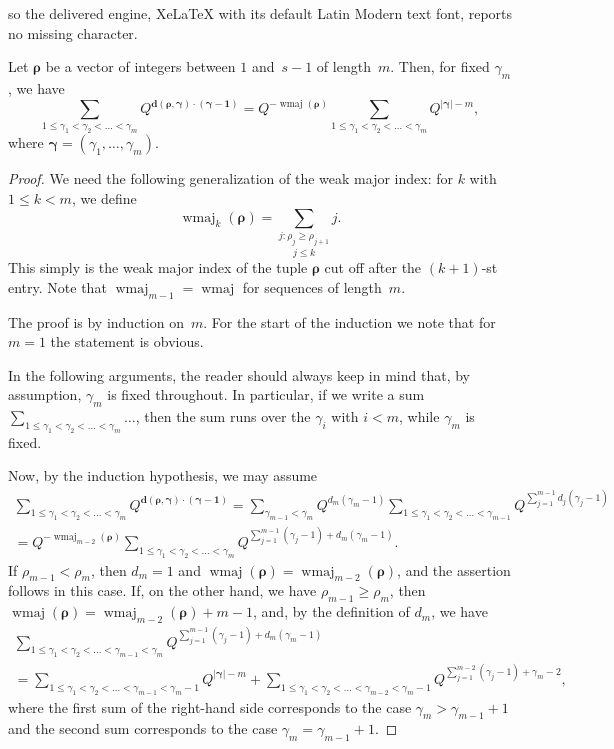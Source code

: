 \documentclass[10pt,a4paper]{amsart}
\DeclareMathOperator{\wmaj}{wmaj}
\newcommand{\posi}{{\gamma}}
\newcommand{\pos}{{\boldsymbol\gamma}}
\newcommand{\rem}{{\boldsymbol\rho}}
\begin{document}
so the delivered engine, XeLaTeX with its default Latin Modern text font, reports no missing character.
\begin{lemma}
\label{maj}
Let $\rem$ be a vector of integers between $1$ and~$s-1$ of length~$m$. Then, for fixed $\posi_m$, we have
$$
\sum_{1 \le \posi_1 < \posi_2 < \dots < \posi_m} Q^{{\mathbf d}(\rem,\pos) \cdot ({\pos- \mathbf 1})} =
Q^{-\wmaj(\rem)} \sum_{1 \le \posi_1 < \posi_2 < \dots < \posi_m} Q^{|\pos|-m},
$$
where $\pos=(\posi_1,\dots,\posi_m)$.
\end{lemma}

\begin{proof}
We need the following generalization of the weak major index: for $k$ with $1 \le k < m$,
we define
$$
\wmaj_k(\rem)= \underset{j\le k}{\sum_{j:\rho_j \ge \rho_{j+1}}} j.
$$
This simply is the weak major index of the tuple $\rem$ cut off after
the {$(k+1)$-st entry.} Note that $\wmaj_{m-1}=\wmaj$ for sequences of
length~$m$. 

The proof is by induction on~$m$. For the start of the
induction we note that for $m=1$ the statement is obvious.

In the following arguments, the reader should always keep in mind
that, by assumption, $\posi_m$ is fixed throughout.
In particular, if we write a sum 
$\sum_{1 \le \posi_1 < \posi_2 < \dots < \posi_m} \dots$, then the
sum runs over the $\posi_i$ with $i<m$, while $\posi_m$ is fixed. 

Now, by the induction hypothesis, we may assume
\begin{multline*}
\sum_{1 \le \posi_1 < \posi_2 < \dots < \posi_m} Q^{{\mathbf d}(\rem, \pos) \cdot ({\pos- \mathbf 1})}
=\sum_{\posi_{m-1}<\posi_{m}} Q^{d_m(\gamma_m -1)} \sum_{1 \le \posi_1 < \posi_2 < \dots < \posi_{m-1}} Q^{\sum_{j=1}^{m-1} d_j(\posi_j-1)}\\ 
=Q^{-\wmaj_{m-2}(\rem)}
\sum_{1 \le \posi_1 < \posi_2 < \dots < \posi_m} Q^{\sum_{j=1}^{m-1} (\posi_j-1) + d_{m} (\posi_{m}-1)}.
\end{multline*}
If $\rho_{m-1} < \rho_m$, then $d_m=1$ and
$\wmaj(\rem)=\wmaj_{m-2}(\rem)$, and the assertion follows in this
case. If, on the other hand, we have $\rho_{m-1} \ge \rho_m$, then
$\wmaj(\rem)=\wmaj_{m-2}(\rem)+m-1$, and, by the definition of $d_m$, we
have
\begin{multline}
\label{left}
\sum_{1 \le \posi_1 < \posi_2 < \dots < \posi_{m-1} < \posi_m} Q^{\sum_{j=1}^{m-1} (\posi_j-1) + d_{m} (\posi_{m}-1)} \\
= \sum_{1 \le \posi_1 < \posi_2 < \dots < \posi_{m-1} < \posi_m-1} Q^{|\pos|-m}
+ \sum_{ 1 \le \posi_1 < \posi_2 < \dots < \posi_{m-2} < \posi_m-1} Q^{\sum_{j=1}^{m-2} (\posi_j-1)+\posi_{m}-2},
\end{multline}
where the first sum of the right-hand side corresponds to the case $\posi_m > \posi_{m-1}+1$ and the second sum corresponds to the case $\posi_m = \posi_{m-1}+1$.


\end{proof}
\end{document}
